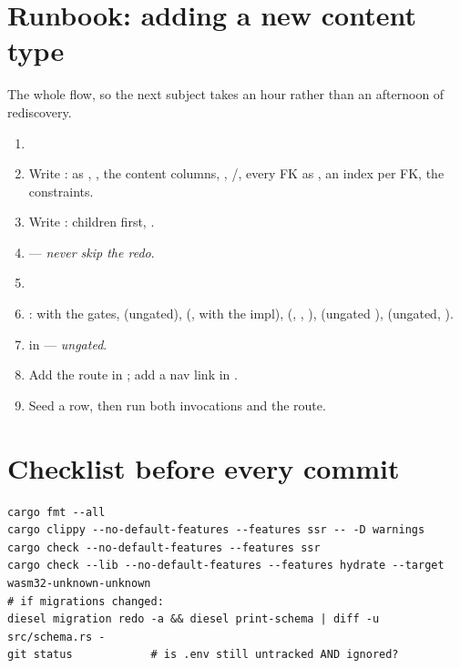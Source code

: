 \section{Runbook: adding a new content type}

The whole flow, so the next subject takes an hour rather than an afternoon of rediscovery.

\begin{runbook}
\begin{enumerate}
  \item {}
  \item Write :  as ,
    , the content columns, ,
    /, every FK as , an index per FK, the  constraints.
  \item Write : children first, .
  \item {} --- \emph{never skip the redo}.
  \item {}
  \item {}:  with the gates,  (ungated),
     (, with the  impl),  (,
    , ),  (ungated \code{\#[server]}),
     (ungated, ).
  \item {} in  --- \emph{ungated}.
  \item Add the route in ; add a nav link in .
  \item Seed a row, then run both  invocations and  the route.
\end{enumerate}
\end{runbook}

\section{Checklist before every commit}

\begin{lstlisting}[style=sh]
cargo fmt --all
cargo clippy --no-default-features --features ssr -- -D warnings
cargo check --no-default-features --features ssr
cargo check --lib --no-default-features --features hydrate --target wasm32-unknown-unknown
# if migrations changed:
diesel migration redo -a && diesel print-schema | diff -u src/schema.rs -
git status            # is .env still untracked AND ignored?
\end{lstlisting}

